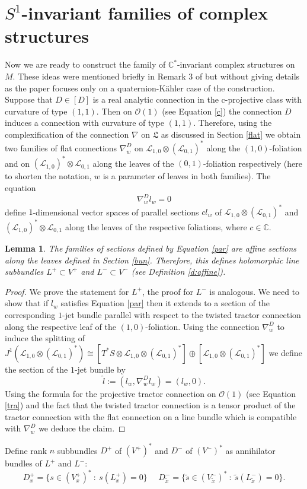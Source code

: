 \documentclass{amsart}
\newtheorem{lem}{Lemma}[section]
\begin{document}
\section{$S^1$-invariant families of complex structures}\label{fami}
Now we are ready to construct the family 
of $\mathbb{C}^*$-invariant complex structures on $M$. These ideas were mentioned briefly in Remark 3 of \cite{Bo} but without giving details as the paper focuses only on a quaternion-K\"ahler case of the construction. 
Suppose that $D\in [D]$ is a real analytic connection in the c-projective class with curvature of type $(1,1)$. Then on $\mathcal{O}(1)$ (see Equation \ref{c}) the connection $D$ induces a connection with curvature of type $(1,1)$. Therefore, using the complexification of the connection $\nabla$ on $\mathfrak{L}$ as discussed in Section \ref{flat} we obtain two families of flat connections $\nabla^D_{w}$ on $\mathcal{L}_{1,0}\otimes(\mathcal{L}_{0,1})^*$ along the $(1,0)$-foliation and on $(\mathcal{L}_{1,0})^*\otimes\mathcal{L}_{0,1}$  along the leaves of the $(0,1)$-foliation respectively (here to shorten the notation, $w$ is a parameter of leaves in both families). The equation 
\begin{equation}\label{par}
\nabla^D_{w}l_w=0 
\end{equation}
define $1$-dimensional vector spaces of parallel sections $cl_w$ of  $\mathcal{L}_{1,0}\otimes(\mathcal{L}_{0,1})^*$ and $(\mathcal{L}_{1,0})^*\otimes\mathcal{L}_{0,1}$ along the leaves of the respective foliations, where $c\in \mathbb{C}$.
\begin{lem}
The families of sections defined by Equation \ref{par} are affine sections along the leaves defined in Section \ref{bun}. Therefore, this defines holomorphic line subbundles $L^+\subset V^+$ and $L^-\subset V^-$ (see Definition \ref{d:affine}).
\end{lem}
\begin{proof}
  We prove the statement for $L^+$, the proof for $L^-$ is analogous. We need to show that if $l_w$ satisfies Equation \ref{par}  then it extends to a section of the corresponding $1$-jet bundle parallel with respect to the twisted tractor connection along the respective leaf of the $(1,0)$-foliation. Using the connection $\nabla^D_w$ to induce the splitting of  $J^1(\mathcal{L}_{1,0}\otimes(\mathcal{L}_{0,1})^*)\cong [T^*S\otimes\mathcal{L}_{1,0}\otimes(\mathcal{L}_{0,1})^*]\oplus[\mathcal{L}_{1,0}\otimes(\mathcal{L}_{0,1})^*]$ we define the section of the $1$-jet bundle by $$\hat{l}:=(l_w,\nabla^D_wl_w)=(l_w,0).$$
  Using the formula for the projective tractor connection on $\mathcal{O}(1)$ (see Equation \ref{tra}) and the fact that the twisted tractor connection is a tensor product of the tractor connection with the flat connection on a line bundle which is compatible with $\nabla^D_w$ we deduce the claim.
\end{proof}
Define rank $n$ subbundles $D^+$ of $(V^+)^*$ and  $D^-$ of $(V^-)^*$ as annihilator bundles of $L^+$ and $L^-$: $$D^+_x=\{s\in (V^+_x)^*\ :\ s(L^+_x)=0\}\ \ \ \ \ \  D^-_{\tilde{x}}=\{\tilde{s}\in (V^-_{\tilde{x}})^*\ :\ \tilde{s}(L^-_{\tilde{x}})=0\}.$$  
\end{document}
